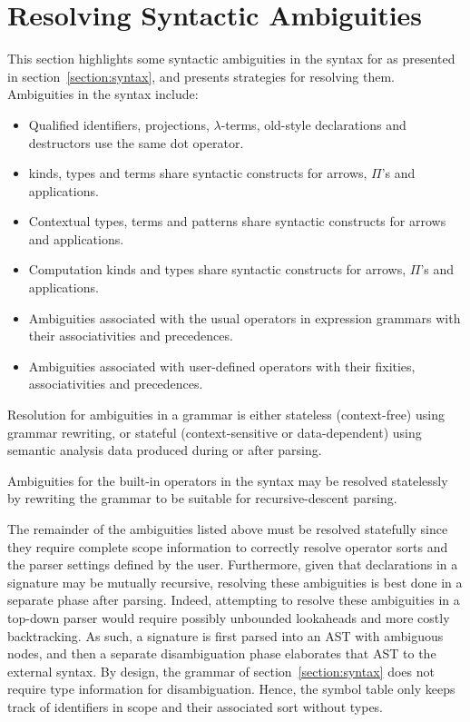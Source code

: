 \section{Resolving Syntactic Ambiguities}\label{section:resolving-grammar-ambiguities}

This section highlights some syntactic ambiguities in the syntax for \Beluga as presented in section~\ref{section:syntax}, and presents strategies for resolving them.
Ambiguities in the syntax include:
\begin{itemize}
\item Qualified identifiers, projections, $\lambda$-terms, old-style \LF declarations and destructors use the same dot operator.
\item \LF kinds, types and terms share syntactic constructs for arrows, $ \Pi $'s and applications.
\item Contextual \LF types, terms and patterns share syntactic constructs for arrows and applications.
\item Computation kinds and types share syntactic constructs for arrows, $ \Pi $'s and applications.
\item Ambiguities associated with the usual operators in expression grammars with their associativities and precedences.
\item Ambiguities associated with user-defined operators with their fixities, associativities and precedences.
\end{itemize}

Resolution for ambiguities in a grammar is either stateless (context-free) using grammar rewriting, or stateful (context-sensitive or data-dependent) using semantic analysis data produced during or after parsing.

Ambiguities for the built-in operators in the syntax may be resolved statelessly by rewriting the grammar to be suitable for recursive-descent parsing.

The remainder of the ambiguities listed above must be resolved statefully since they require complete scope information to correctly resolve operator sorts and the parser settings defined by the user.
Furthermore, given that declarations in a \Beluga signature may be mutually recursive, resolving these ambiguities is best done in a separate phase after parsing.
Indeed, attempting to resolve these ambiguities in a top-down parser would require possibly unbounded lookaheads and more costly backtracking.
As such, a \Beluga signature is first parsed into an \ac{AST} with ambiguous nodes, and then a separate disambiguation phase elaborates that \ac{AST} to the external syntax.
By design, the grammar of section~\ref{section:syntax} does not require type information for disambiguation.
Hence, the symbol table only keeps track of identifiers in scope and their associated sort without types.

